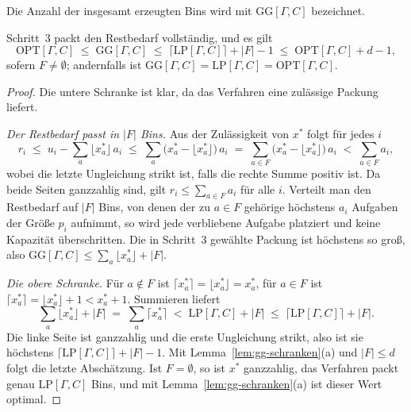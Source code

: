 \noindent
Die Anzahl der insgesamt erzeugten Bins wird mit $\mathrm{GG}[\Gamma, C]$ bezeichnet.

\begin{lemma}[Rundungsschranke]
\label{lem:gg-rundung}
Schritt~3 packt den Restbedarf vollständig, und es gilt
\[
  \mathrm{OPT}[\Gamma, C] \;\le\; \mathrm{GG}[\Gamma, C] \;\le\;
  \big\lceil \mathrm{LP}[\Gamma, C] \big\rceil + |F| - 1 \;\le\;
  \mathrm{OPT}[\Gamma, C] + d - 1,
\]
sofern $F \neq \emptyset$; andernfalls ist
$\mathrm{GG}[\Gamma, C] = \mathrm{LP}[\Gamma, C] = \mathrm{OPT}[\Gamma, C]$.
\end{lemma}

\begin{proof}
Die untere Schranke ist klar, da das Verfahren eine zulässige Packung liefert.

\emph{Der Restbedarf passt in $|F|$ Bins.}
Aus der Zulässigkeit von $x^\ast$ folgt für jedes $i$
\[
  r_i \;\le\; u_i - \sum_{a} \lfloor x^\ast_a \rfloor\, a_i
  \;\le\; \sum_{a} \big(x^\ast_a - \lfloor x^\ast_a \rfloor\big)\, a_i
  \;=\; \sum_{a \in F} \big(x^\ast_a - \lfloor x^\ast_a \rfloor\big)\, a_i
  \;<\; \sum_{a \in F} a_i ,
\]
wobei die letzte Ungleichung strikt ist, falls die rechte Summe positiv ist.
Da beide Seiten ganzzahlig sind, gilt $r_i \le \sum_{a \in F} a_i$ für alle $i$.
Verteilt man den Restbedarf auf $|F|$ Bins, von denen der zu $a \in F$ gehörige höchstens $a_i$
Aufgaben der Größe $p_i$ aufnimmt, so wird jede verbliebene Aufgabe platziert und keine
Kapazität überschritten.
Die in Schritt~3 gewählte Packung ist höchstens so groß, also
$\mathrm{GG}[\Gamma, C] \le \sum_{a} \lfloor x^\ast_a \rfloor + |F|$.

\emph{Die obere Schranke.}
Für $a \notin F$ ist $\lceil x^\ast_a \rceil = \lfloor x^\ast_a \rfloor = x^\ast_a$, für $a \in F$
ist $\lceil x^\ast_a \rceil = \lfloor x^\ast_a \rfloor + 1 < x^\ast_a + 1$.
Summieren liefert
\[
  \sum_{a} \lfloor x^\ast_a \rfloor + |F| \;=\; \sum_{a} \lceil x^\ast_a \rceil
  \;<\; \mathrm{LP}[\Gamma, C] + |F| \;\le\; \lceil \mathrm{LP}[\Gamma, C] \rceil + |F| .
\]
Die linke Seite ist ganzzahlig und die erste Ungleichung strikt, also ist sie höchstens
$\lceil \mathrm{LP}[\Gamma, C] \rceil + |F| - 1$.
Mit Lemma~\ref{lem:gg-schranken}(a) und $|F| \le d$ folgt die letzte Abschätzung.
Ist $F = \emptyset$, so ist $x^\ast$ ganzzahlig, das Verfahren packt genau
$\mathrm{LP}[\Gamma, C]$ Bins, und mit Lemma~\ref{lem:gg-schranken}(a) ist dieser Wert optimal.
\end{proof}


